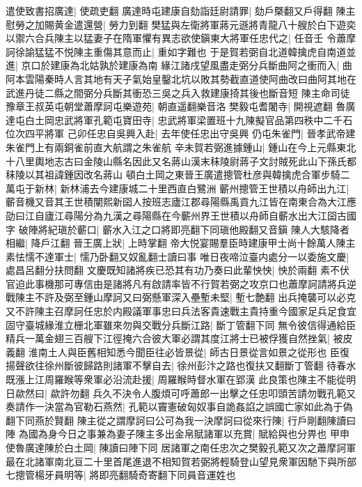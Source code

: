 遣使致書招廣達|{
	使疏吏翻}
廣達時屯建康自劾詣廷尉請罪|{
	劾戶槩翻又戶得翻}
陳主慰勞之加賜黄金遣還營|{
	勞力到翻}
樊猛與左衛將軍蔣元遜將青龍八十艘於白下遊奕以禦六合兵陳主以猛妻子在隋軍懼有異志欲使鎭東大將軍任忠代之|{
	任音壬}
令蕭摩訶徐諭猛猛不悦陳主重傷其意而止|{
	重如字難也}
于是賀若弼自北道韓擒虎自南道並進|{
	京口於建康為北姑孰於建康為南}
緣江諸戌望風盡走弼分兵斷曲阿之衝而入|{
	曲阿本雲陽秦時人言其地有天子氣始皇鑿北坑以敗其勢截直道使阿曲改曰曲阿其地在武進丹徒二縣之間弼分兵斷其衝恐三吳之兵入救建康掎其後也斷音短}
陳主命司徒豫章王叔英屯朝堂蕭摩訶屯樂遊苑|{
	朝直遥翻樂音洛}
樊毅屯耆闍寺|{
	開視遮翻}
魯廣達屯白土岡忠武將軍孔範屯寶田寺|{
	忠武將軍梁置班十九陳擬官品第四秩中二千石位次四平將軍}
己卯任忠自吳興入赴|{
	去年使任忠出守吳興}
仍屯朱雀門|{
	晉孝武帝建朱雀門上有兩銅雀前直大航謂之朱雀航}
辛未賀若弼進據鍾山|{
	鍾山在今上元縣東北十八里輿地志古曰金陵山縣名因此又名蔣山漢末秣陵尉蔣子文討賊死此山下孫氏都秣陵以其祖諱鍾因改名蔣山}
頓白土岡之東晉王廣遣摠管杜彦與韓擒虎合軍步騎二萬屯于新林|{
	新林浦去今建康城二十里西直白鷺洲}
蘄州摠管王世積以舟師出九江|{
	蘄音機又音其王世積闡熙新囶人按班志廬江郡尋陽縣禹貢九江皆在南東合為大江應劭曰江自廬江尋陽分為九漢之尋陽縣在今蘄州界王世積以舟師自蘄水出大江囶古國字}
破陣將紀瑱於蘄口|{
	蘄水入江之口將即亮翻下同瑱他殿翻又音鎭}
陳人大駭降者相繼|{
	降戶江翻}
晉王廣上狀|{
	上時掌翻}
帝大悦宴賜羣臣時建康甲士尚十餘萬人陳主素怯懦不達軍士|{
	懦乃卧翻又奴亂翻士讀曰事}
唯日夜啼泣臺内處分一以委施文慶|{
	處昌呂翻分扶問翻}
文慶既知諸將疾已恐其有功乃奏曰此輩怏怏|{
	怏於兩翻}
素不伏官迫此事機那可專信由是諸將凡有啟請率皆不行賀若弼之攻京口也蕭摩訶請將兵逆戰陳主不許及弼至鍾山摩訶又曰弼懸軍深入壘塹未堅|{
	塹七艶翻}
出兵掩襲可以必克又不許陳主召摩訶任忠於内殿議軍事忠曰兵法客貴速戰主貴持重今國家足兵足食宜固守臺城緣淮立栅北軍雖來勿與交戰分兵斷江路|{
	斷丁管翻下同}
無令彼信得通給臣精兵一萬金翅三百艘下江徑掩六合彼大軍必謂其度江將士已被俘獲自然挫氣|{
	被皮義翻}
淮南土人與臣舊相知悉今聞臣往必皆景從|{
	師古日景從言如景之從形也}
臣復揚聲欲往徐州斷彼歸路則諸軍不擊自去|{
	徐州彭汴之路也復扶又翻斷丁管翻}
待春水既漲上江周羅睺等衆軍必沿流赴援|{
	周羅睺時督水軍在郢漢}
此良策也陳主不能從明日歘然曰|{
	歘許勿翻}
兵久不決令人腹煩可呼蕭郎一出擊之任忠叩頭苦請勿戰孔範又奏請作一決當為官勒石燕然|{
	孔範以竇憲破匈奴事自詭姦諂之誤國亡家如此為于偽翻下同燕於賢翻}
陳主從之謂摩訶曰公可為我一決摩訶曰從來行陳|{
	行戶剛翻陳讀曰陣}
為國為身今日之事兼為妻子陳主多出金帛賦諸軍以充賞|{
	賦給與也分畀也}
甲申使魯廣達陳於白土岡|{
	陳讀曰陣下同}
居諸軍之南任忠次之樊毅孔範又次之蕭摩訶軍最在北諸軍南北亘二十里首尾進退不相知賀若弼將輕騎登山望見衆軍因馳下與所部七摠管楊牙員明等|{
	將即亮翻騎奇寄翻下同員音運姓也}
